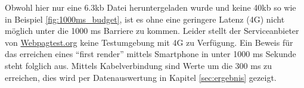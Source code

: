 	  Obwohl hier nur eine 6.3kb Datei heruntergeladen wurde und keine 40kb so wie in Beispiel \ref{fig:1000ms_budget}, ist es ohne eine geringere Latenz (4G) nicht möglich unter die 1000 ms Barriere zu kommen. Leider stellt der Serviceanbieter von \url{Webpagtest.org} keine Testumgebung mit 4G zu Verfügung. Ein Beweis für das erreichen eines "`first render"' mittels Smartphone in unter 1000 ms Sekunde steht folglich aus. Mittels Kabelverbindung sind Werte um die 300 ms zu erreichen, dies wird per Datenauswertung in Kapitel \ref{sec:ergebnis} gezeigt.



\pagebreak

